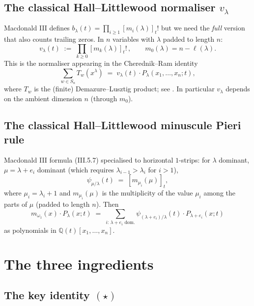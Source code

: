 \documentclass[11pt]{article}
\theoremstyle{definition}
\newcommand{\Q}{\mathbb{Q}}
\newcommand{\Sn}{S_n}
\begin{document}
\subsection{The classical Hall--Littlewood normaliser $v_\lambda$}
Macdonald III \cite{MacdonaldSFHP} defines
$b_\lambda(t) = \prod_{i \ge 1} [m_i(\lambda)]_t!$ but we need the
\emph{full} version that also counts trailing zeros. In $n$ variables
with $\lambda$ padded to length $n$:
\[
v_\lambda(t) \;:=\; \prod_{k \ge 0} [m_k(\lambda)]_t!\,, \qquad m_0(\lambda) = n - \ell(\lambda).
\]
This is the normaliser appearing in the Cherednik--Ram identity
\begin{equation}
\sum_{w \in \Sn} T_w(x^\lambda) \;=\; v_\lambda(t) \cdot P_\lambda(x_1,\ldots,x_n;t),
\label{eq:linear-cr}
\end{equation}
where $T_w$ is the (finite) Demazure--Lusztig product; see
\cite{Cherednik,ClioLinear}. In particular $v_\lambda$ depends on the
ambient dimension $n$ (through $m_0$).

\subsection{The classical Hall--Littlewood minuscule Pieri rule}
Macdonald III \cite{MacdonaldSFHP} formula (III.5.7) specialised to horizontal
$1$-strips: for $\lambda$ dominant, $\mu = \lambda + e_i$ dominant (which
requires $\lambda_{i-1} > \lambda_i$ for $i > 1$),
\begin{equation}
\psi_{\mu/\lambda}(t) \;=\; [m_{\mu_i}(\mu)]_t,
\label{eq:psi}
\end{equation}
where $\mu_i = \lambda_i + 1$ and $m_{\mu_i}(\mu)$ is the multiplicity of the
value $\mu_i$ among the parts of $\mu$ (padded to length $n$). Then
\begin{equation}
m_{\omega_1}(x) \cdot P_\lambda(x;t) \;=\; \sum_{i:\, \lambda+e_i\text{ dom.}} \psi_{(\lambda+e_i)/\lambda}(t)\cdot P_{\lambda+e_i}(x;t)
\label{eq:ord-pieri}
\end{equation}
as polynomials in $\Q(t)[x_1,\ldots,x_n]$.

\section{The three ingredients}

\subsection{The key identity $(\star)$}
\end{document}
